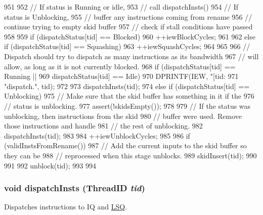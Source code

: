\begin{DoxyCode}
951 {
952     // If status is Running or idle,
953     //     call dispatchInsts()
954     // If status is Unblocking,
955     //     buffer any instructions coming from rename
956     //     continue trying to empty skid buffer
957     //     check if stall conditions have passed
958 
959     if (dispatchStatus[tid] == Blocked) {
960         ++iewBlockCycles;
961 
962     } else if (dispatchStatus[tid] == Squashing) {
963         ++iewSquashCycles;
964     }
965 
966     // Dispatch should try to dispatch as many instructions as its bandwidth
967     // will allow, as long as it is not currently blocked.
968     if (dispatchStatus[tid] == Running ||
969         dispatchStatus[tid] == Idle) {
970         DPRINTF(IEW, "[tid:%
971                 "dispatch.\n", tid);
972 
973         dispatchInsts(tid);
974     } else if (dispatchStatus[tid] == Unblocking) {
975         // Make sure that the skid buffer has something in it if the
976         // status is unblocking.
977         assert(!skidsEmpty());
978 
979         // If the status was unblocking, then instructions from the skid
980         // buffer were used.  Remove those instructions and handle
981         // the rest of unblocking.
982         dispatchInsts(tid);
983 
984         ++iewUnblockCycles;
985 
986         if (validInstsFromRename()) {
987             // Add the current inputs to the skid buffer so they can be
988             // reprocessed when this stage unblocks.
989             skidInsert(tid);
990         }
991 
992         unblock(tid);
993     }
994 }
\end{DoxyCode}
\hypertarget{classDefaultIEW_ada6ba514c48bb66235f0e4dba539b393}{
\subsubsection[{dispatchInsts}]{\setlength{\rightskip}{0pt plus 5cm}void dispatchInsts ({\bf ThreadID} {\em tid})}}
\label{classDefaultIEW_ada6ba514c48bb66235f0e4dba539b393}
Dispatches instructions to IQ and \hyperlink{classLSQ}{LSQ}. 


